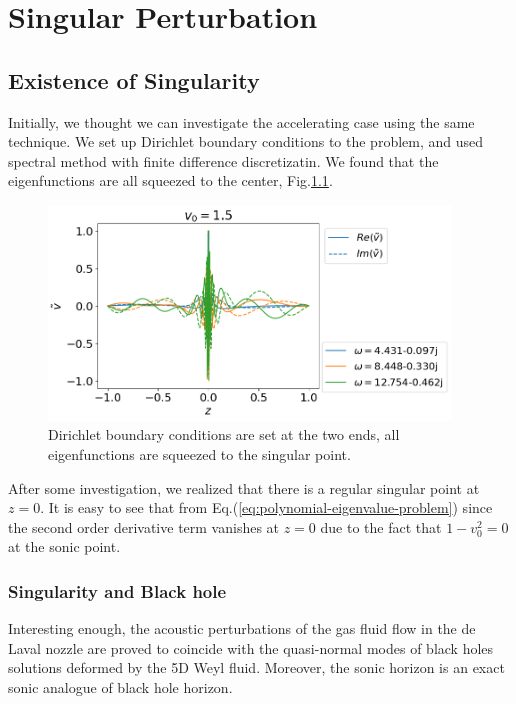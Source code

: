 \chapter{Singular Perturbation}
\section{Existence of Singularity}
Initially, we thought we can investigate the accelerating case using the same technique. We set up Dirichlet boundary conditions to the problem, and used spectral method with finite difference discretizatin. We found that the eigenfunctions are all squeezed to the center, Fig.\ref{fig:bad-accelerating-v}.
\begin{figure}[htbp]
  \begin{center}
    \includegraphics[width=0.95\textwidth]{figures/results-bad-accelerating-v.png}
  \end{center}
  \caption{Dirichlet boundary conditions are set at the two ends, all eigenfunctions are squeezed to the singular point.}
  \label{fig:bad-accelerating-v}
\end{figure}


After some investigation, we realized that there is a regular singular point at $z=0$. It is easy to see that from Eq.(\ref{eq:polynomial-eigenvalue-problem}) since the second order derivative term vanishes at $z=0$ due to the fact that $1-v_0^2=0$ at the sonic point.

\subsection{Singularity and Black hole}
Interesting enough, the acoustic perturbations of the gas fluid flow in the de Laval nozzle are proved to coincide with the quasi-normal modes of black holes solutions deformed by the 5D Weyl fluid. \cite{da_rocha_black_2017, furuhashi_simulation_2006} Moreover, the sonic horizon is an exact sonic analogue of black hole horizon. \cite{unruh_sonic_1995}

